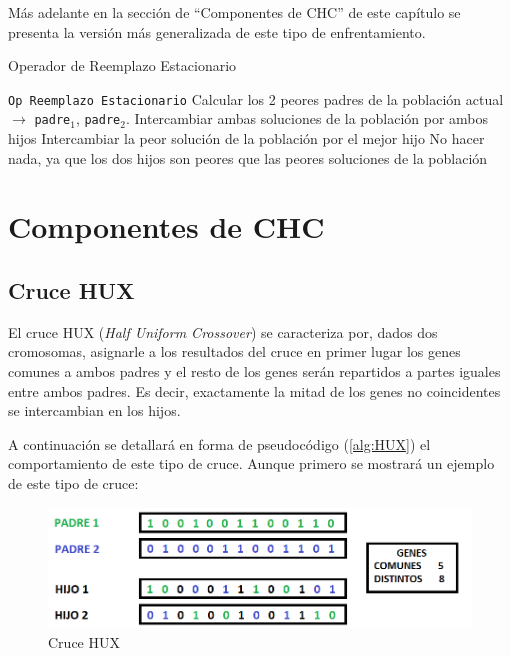 Más adelante en la sección de ``Componentes de CHC'' de este capítulo se presenta la versión más generalizada de este tipo de enfrentamiento.

\begin{algorithm}[H]
\caption{Operador de Reemplazo Estacionario}\label{alg:ORE}
\begin{algorithmic}[1]
\Procedure \texttt{Op Reemplazo Estacionario}
\State Calcular los 2 peores padres de la población actual $\xrightarrow{}{}$ \texttt{padre$_1$}, \texttt{padre$_2$}.
	\State Intercambiar ambas soluciones de la población por ambos hijos
	\State Intercambiar la peor solución de la población por el mejor hijo
\Else
	\State No hacer nada, ya que los dos hijos son peores que las peores soluciones de la población
\EndIf
\EndProcedure
\end{algorithmic}
\end{algorithm}

\section{Componentes de CHC}

\subsection{Cruce HUX}

El cruce HUX (\textit{Half Uniform Crossover}) se caracteriza por, dados dos cromosomas, asignarle a los resultados del cruce en primer lugar los genes comunes a ambos padres y el resto de los genes serán repartidos a partes iguales entre ambos padres. 
Es decir, exactamente la mitad de los genes no coincidentes se intercambian en los hijos. 

A continuación se detallará en forma de pseudocódigo (\ref{alg:HUX}) el comportamiento de este tipo de cruce. 
Aunque primero se mostrará un ejemplo de este tipo de cruce:

\begin{figure}[H]
		\centering
		\includegraphics[scale=0.5]{imagenes/CrossoverHUX.png}
        \caption{Cruce HUX}
        \label{fig:HUX}
\end{figure}

